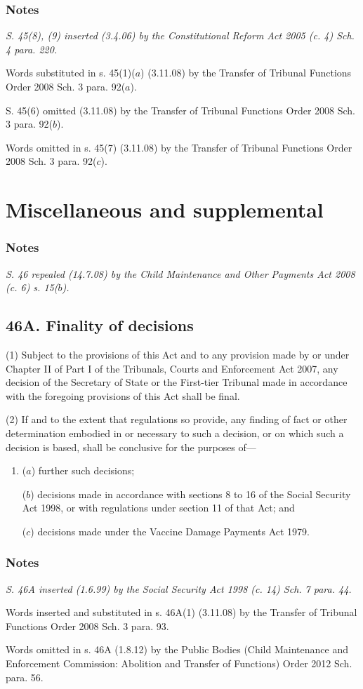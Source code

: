 \documentclass[a4paper]{article}
\newcommand\amendment[1]{\subsubsection*{Notes}{\itshape\frenchspacing\footnotesize #1 \par}}
\begin{document}
\amendment{
S. 45(8), (9) inserted (3.4.06) by the Constitutional Reform Act 2005 (c. 4) Sch. 4 para. 220.

Words substituted in s. 45(1)($a$) (3.11.08) by the Transfer of Tribunal Functions Order 2008 Sch. 3 para. 92($a$).

S. 45(6) omitted (3.11.08) by the Transfer of Tribunal Functions Order 2008 Sch. 3 para. 92($b$).

Words omitted in s. 45(7) (3.11.08) by the Transfer of Tribunal Functions Order 2008 Sch. 3 para. 92($c$).
}

\section{Miscellaneous and supplemental}

\amendment{
S. 46 repealed (14.7.08) by the Child Maintenance and Other Payments Act 2008 (c. 6) s. 15($b$).
}

\subsection{46A. Finality of decisions}

(1) Subject to the provisions of this Act and to any provision made by or under Chapter II of Part I of the Tribunals, Courts and Enforcement Act 2007, any decision of the Secretary of State or the First-tier Tribunal made in accordance with the foregoing provisions of this Act shall be final.

(2) If and to the extent that regulations so provide, any finding of fact or other determination embodied in or necessary to such a decision, or on which such a decision is based, shall be conclusive for the purposes of---
\begin{enumerate}\item[]
($a$) further such decisions;

($b$) decisions made in accordance with sections 8 to 16 of the Social Security
Act 1998, or with regulations under section 11 of that Act; and

($c$) decisions made under the Vaccine Damage Payments Act 1979.
\end{enumerate}

\amendment{
S. 46A inserted (1.6.99) by the Social Security Act 1998 (c. 14) Sch. 7 para. 44.

Words inserted and substituted in s. 46A(1) (3.11.08) by the Transfer of Tribunal Functions Order 2008 Sch. 3 para. 93.

Words omitted in s. 46A (1.8.12) by the Public Bodies (Child Maintenance and Enforcement Commission: Abolition and Transfer of Functions) Order 2012 Sch. para. 56.

}
\end{document}
